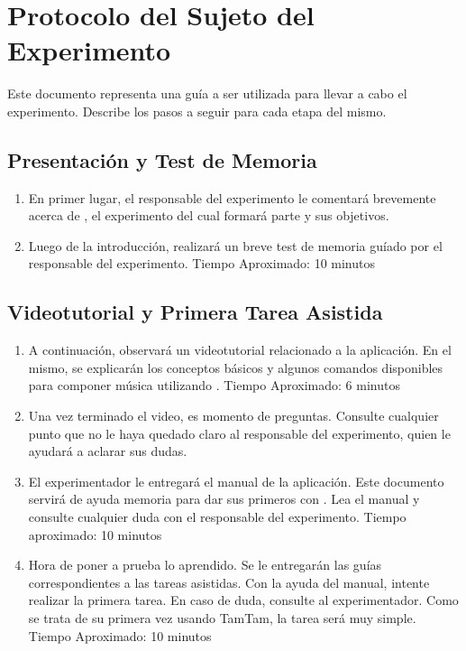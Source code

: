 \section{Protocolo del Sujeto del Experimento}

Este documento representa una gu\'ia a ser utilizada para llevar a cabo el experimento. Describe los pasos a seguir para cada etapa del mismo.

\subsection{Presentaci\'on y Test de Memoria}

\begin{enumerate}
    \item En primer lugar, el responsable del experimento le comentar\'a brevemente acerca de 
    , el experimento del cual formar\'a parte y sus objetivos.
    \item Luego de la introducci\'on, realizar\'a un breve test de memoria gu\'iado por el responsable del experimento. Tiempo Aproximado: 10 minutos
    \setcounter{enumTemp}{\theenumi}
\end{enumerate}

\subsection{Videotutorial y Primera Tarea Asistida}
\begin{enumerate}
    \setcounter{enumi}{\theenumTemp}
    \item A continuaci\'on, observar\'a un videotutorial relacionado a la aplicaci\'on. En el mismo, se
     explicar\'an los conceptos b\'asicos y algunos comandos disponibles para componer m\'usica utilizando 
    . 
    Tiempo Aproximado: 6 minutos
    \item Una vez terminado el video, es momento de preguntas. Consulte cualquier punto que no le haya quedado claro al responsable del experimento, quien le ayudar\'a a aclarar sus dudas.
    \item El experimentador le entregar\'a el manual de la aplicaci\'on. Este documento servir\'a de ayuda memoria para dar sus primeros con . Lea el manual y consulte cualquier duda con el responsable del experimento.
        Tiempo aproximado: 10 minutos
    \item Hora de poner a prueba lo aprendido. Se le entregar\'an las gu\'ias correspondientes a las tareas asistidas. Con la ayuda del manual, intente realizar la primera tarea. En caso de duda, consulte al experimentador. Como se trata de su primera vez usando TamTam, la tarea ser\'a muy simple.
    Tiempo Aproximado: 10 minutos
    \setcounter{enumTemp}{\theenumi}
\end{enumerate}

